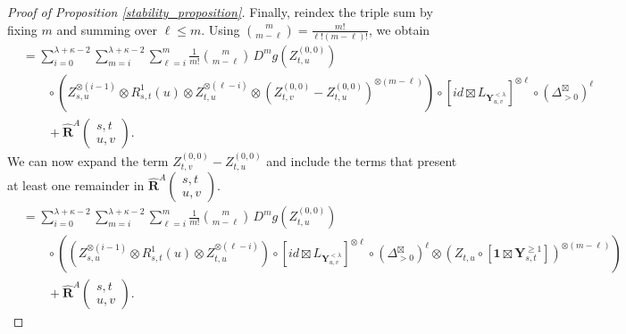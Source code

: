 \documentclass[10pt,a4paper]{amsart}
\begin{document}
\begin{proof}[Proof of Proposition \ref{stability_proposition}]
Finally, reindex the triple sum by fixing $m$ and summing over $\ell\le m$.
Using $\binom{m}{m-\ell}=\frac{m!}{\ell!(m-\ell)!}$, we obtain
\begin{align*}
&=
\sum_{i=0}^{\lambda+\kappa-2}
\sum_{m=i}^{\lambda+\kappa-2}
\sum_{\ell=i}^{m}
\frac{1}{m!}\binom{m}{m-\ell}\,
D^m g\left(Z^{(0,0)}_{t,u}\right)
\\
&\qquad\circ
\left(
Z^{\otimes(i-1)}_{s,u}\otimes R^{1}_{s,t}(u)\otimes Z^{\otimes(\ell-i)}_{t,u}
\otimes
\left(Z^{(0,0)}_{t,v}-Z^{(0,0)}_{t,u}\right)^{\otimes(m-\ell)}
\right)
\circ
\left[id \boxtimes L_{\mathbf{Y}^{<\lambda}_{u,v}}\right]^{\otimes\ell}
\circ (\Delta^{\boxtimes}_{>0})^\ell
\\
&\qquad + \hat{\mathbf{R}}^{A}\begin{pmatrix} s,t \\ u, v \end{pmatrix}.
\end{align*}
We can now expand the term $Z^{(0,0)}_{t,v} - Z^{(0,0)}_{t,u}$ and include the terms that present at least one remainder in $\hat{\mathbf{R}}^{A}\begin{pmatrix} s,t \\ u, v \end{pmatrix}$.\newline
\begin{align*}
&=
\sum_{i=0}^{\lambda+\kappa-2}
\sum_{m=i}^{\lambda+\kappa-2}
\sum_{\ell=i}^{m}
\frac{1}{m!}\binom{m}{m-\ell}\,
D^m g\left(Z^{(0,0)}_{t,u}\right)
\\
&\qquad \circ \left(
\left(
Z^{\otimes(i-1)}_{s,u}\otimes R^{1}_{s,t}(u)\otimes Z^{\otimes(\ell-i)}_{t,u}
\right)
\circ 
\left[id \boxtimes L_{\mathbf{Y}^{<\lambda}_{u,v}}\right]^{\otimes\ell}
\circ (\Delta^{\boxtimes}_{>0})^\ell \otimes
\left(Z_{t,u} \circ [ \mathbf{1} \boxtimes \mathbf{Y}^{\geq 1}_{s,t}  ]\right)^{\otimes(m-\ell)} \right)
\\
&\qquad + \hat{\mathbf{R}}^{A}\begin{pmatrix} s,t \\ u, v \end{pmatrix}.
\end{align*}
    

\end{proof}
\end{document}
